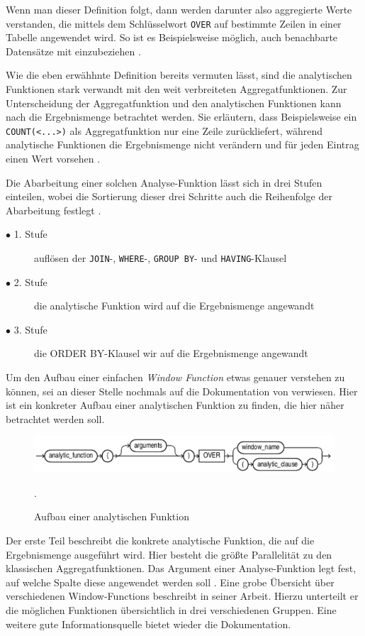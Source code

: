 Wenn man dieser Definition folgt, dann werden darunter also aggregierte Werte verstanden,
die mittels dem Schlüsselwort \texttt{OVER} auf bestimmte Zeilen in einer Tabelle
angewendet wird. So ist es Beispielsweise möglich, auch benachbarte Datensätze mit
einzubeziehen \citep[vgl.][]{oracle}.

Wie die eben erwähhnte Definition bereits vermuten lässt, sind die analytischen Funktionen
stark verwandt mit den weit verbreiteten Aggregatfunktionen. Zur Unterscheidung
der Aggregatfunktion und den analytischen Funktionen kann nach \citet{Nuijten2023}
die Ergebnismenge betrachtet werden. Sie erläutern, dass Beispielsweise ein \texttt{COUNT(<...>)}
als Aggregatfunktion nur eine Zeile zurückliefert, während analytische Funktionen
die Ergebnismenge nicht verändern und für jeden Eintrag einen Wert vorsehen \citep[vgl.][]{Nuijten2023}.

Die Abarbeitung einer solchen Analyse-Funktion lässt sich in drei Stufen
einteilen, wobei die Sortierung dieser drei Schritte auch die Reihenfolge der Abarbeitung
festlegt \citep[vgl.][]{Nuijten2023}.
\begin{description}
	\item[$\bullet$ 1. Stufe] auflösen der \texttt{JOIN}-, \texttt{WHERE}-, \texttt{GROUP
		BY}- und \texttt{HAVING}-Klausel \\ \citep[vgl.][]{Nuijten2023}

	\item[$\bullet$ 2. Stufe] die analytische Funktion wird auf die Ergebnismenge angewandt
		\\ \citep[vgl.][]{Nuijten2023}

	\item[$\bullet$ 3. Stufe] die ORDER BY-Klausel wir auf die Ergebnismenge angewandt
		\\ \citep[vgl.][]{Nuijten2023}
\end{description}
Um den Aufbau einer einfachen \textit{Window Function} etwas genauer verstehen zu
können, sei an dieser Stelle nochmals auf die Dokumentation von \citet{oracle} verwiesen.
Hier ist ein konkreter Aufbau einer analytischen Funktion zu finden, die hier näher
betrachtet werden soll.
\begin{figure}[h]
	\centering
	\includegraphics[scale=0.5]{img/aufbauAnalyticFunction.jpg}
	\caption{ Aufbau einer analytischen Funktion \citep[vgl.][]{oracle}}
	. \label{fig:aufbauAnalyticFunction}
\end{figure}
Der erste Teil beschreibt die konkrete analytische
Funktion, die auf die Ergebnismenge ausgeführt wird. Hier besteht die größte Parallelität
zu den klassischen Aggregatfunktionen. Das Argument einer Analyse-Funktion legt
fest, auf welche Spalte diese angewendet werden soll \citep[vgl.][S.~110]{schicker2017datenbanken}.
Eine grobe Übersicht über verschiedenen Window-Functions beschreibt \citet[]{ibrahaim23}
in seiner Arbeit. Hierzu unterteilt er die möglichen Funktionen übersichtlich in
drei verschiedenen Gruppen. Eine weitere gute Informationsquelle bietet wieder
die \citet{oracle} Dokumentation.


